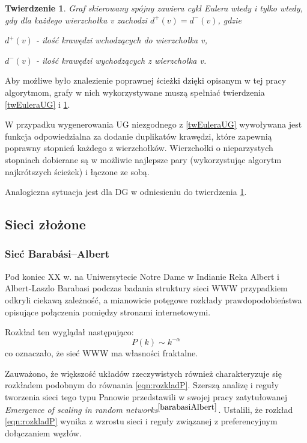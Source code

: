 \documentclass[a4paper, 12pt, twoside, openright]{article}
\newtheorem{theorem}{Twierdzenie}[section]
\begin{document}
	 \begin{theorem}
	 	\label{twEuleraDG}
	 	Graf skierowany spójny zawiera cykl Eulera wtedy i tylko wtedy, gdy
	 	dla każdego wierzchołka v zachodzi $d ^{+} (v) = d ^{-} (v) $, gdzie \indent\par$d ^{+} (v)$ - ilość krawędzi wchodzących do wierzchołka v, \indent\par$d ^{-} (v)$ - ilość krawędzi wychodzących z wierzchołka v.
	 \end{theorem}
 
	 Aby możliwe było znalezienie poprawnej ścieżki dzięki opisanym w tej pracy algorytmom, grafy w nich wykorzystywane muszą spełniać twierdzenia \ref{twEuleraUG} i \ref{twEuleraDG}. 
	 
	 W przypadku wygenerowania UG niezgodnego z \ref{twEuleraUG} wywoływana jest funkcja odpowiedzialna za dodanie duplikatów krawędzi, które zapewnią poprawny stopnień każdego z wierzchołków. Wierzchołki o nieparzystych stopniach dobierane są w możliwie najlepsze pary (wykorzystując algorytm najkrótszych ścieżek) i łączone ze sobą. 
	 
	 Analogiczna sytuacja jest dla DG w odniesieniu do twierdzenia \ref{twEuleraDG}. 
	 

\subsection{Sieci złożone} \label{SieciZlozone}
\subsubsection{Sieć Barabási–Albert}
\indent\par

 	Pod koniec XX w. na Uniwersytecie Notre Dame w Indianie Reka Albert i Albert-Laszlo Barabasi podczas badania struktury sieci WWW przypadkiem odkryli ciekawą zależność, a mianowicie potęgowe rozkłady prawdopodobieństwa opisujące połączenia pomiędzy stronami internetowymi.
 
	 Rozkład ten wyglądał następująco:
 	\begin{equation}
 		\label{eqn:rozkladP}
 		P(k) \sim k ^{-\alpha}
 	\end{equation}
 	co oznaczało, że sieć WWW ma własności fraktalne.

 	Zauważono, że większość układów rzeczywistych również charakteryzuje się rozkładem podobnym do równania \ref{eqn:rozkladP}. Szerszą analizę i reguły tworzenia sieci tego typu Panowie przedstawili w swojej pracy zatytułowanej \textit{Emergence of scaling in random networks}$^{\cite{barabasiAlbert}}$. Ustalili, że rozkład \ref{eqn:rozkladP} wynika z wzrostu sieci i reguły związanej z preferencyjnym dołączaniem węzłów.
 	
\end{document}
